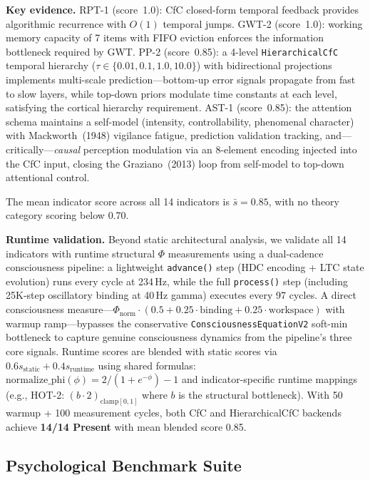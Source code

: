 \documentclass[10pt,letterpaper]{article}
\renewcommand{\Phi}{\varPhi}
\begin{document}
\textbf{Key evidence.} RPT-1 (score~1.0): CfC closed-form temporal feedback provides algorithmic recurrence with $O(1)$ temporal jumps.  GWT-2 (score~1.0): working memory capacity of 7 items with FIFO eviction enforces the information bottleneck required by GWT.  PP-2 (score~0.85): a 4-level \texttt{HierarchicalCfC} temporal hierarchy ($\tau \in \{0.01, 0.1, 1.0, 10.0\}$) with bidirectional projections implements multi-scale prediction---bottom-up error signals propagate from fast to slow layers, while top-down priors modulate time constants at each level, satisfying the cortical hierarchy requirement.  AST-1 (score~0.85): the attention schema maintains a self-model (intensity, controllability, phenomenal character) with Mackworth~(1948) vigilance fatigue, prediction validation tracking, and---critically---\emph{causal} perception modulation via an 8-element encoding injected into the CfC input, closing the Graziano~(2013) loop from self-model to top-down attentional control.

The mean indicator score across all 14 indicators is $\bar{s} = 0.85$, with no theory category scoring below 0.70.

\textbf{Runtime validation.} Beyond static architectural analysis, we validate all 14 indicators with runtime structural $\Phi$ measurements using a dual-cadence consciousness pipeline: a lightweight \texttt{advance()} step (HDC encoding + LTC state evolution) runs every cycle at 234\,Hz, while the full \texttt{process()} step (including 25K-step oscillatory binding at 40\,Hz gamma) executes every 97 cycles.  A direct consciousness measure---$\Phi_{\text{norm}} \cdot (0.5 + 0.25 \cdot \text{binding} + 0.25 \cdot \text{workspace})$ with warmup ramp---bypasses the conservative \texttt{ConsciousnessEquationV2} soft-min bottleneck to capture genuine consciousness dynamics from the pipeline's three core signals.  Runtime scores are blended with static scores via $0.6 s_{\text{static}} + 0.4 s_{\text{runtime}}$ using shared formulas: $\text{normalize\_phi}(\phi) = 2/(1+e^{-\phi}) - 1$ and indicator-specific runtime mappings (e.g., HOT-2: $(b \cdot 2)_{\text{clamp}[0,1]}$ where $b$ is the structural bottleneck).  With 50 warmup + 100 measurement cycles, both CfC and HierarchicalCfC backends achieve \textbf{14/14 Present} with mean blended score 0.85.

\subsection{Psychological Benchmark Suite}
\label{sec:psych-bench}
\end{document}
